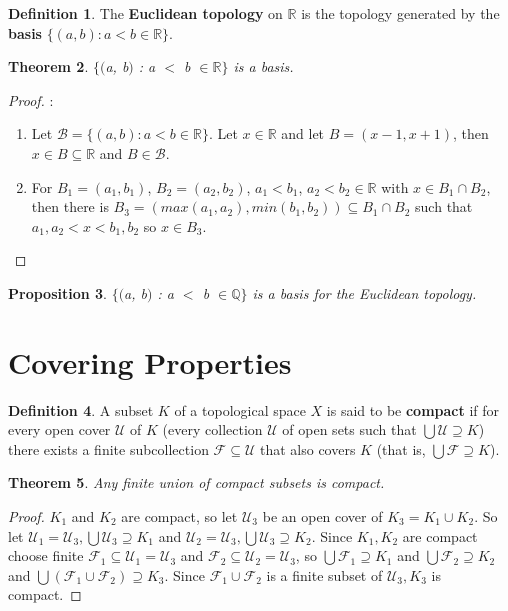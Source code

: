 \documentclass{amsart}
\theoremstyle{plain}
\newtheorem{theorem}{Theorem}
\newtheorem{proposition}[theorem]{Proposition}
\theoremstyle{definition}
\newtheorem{definition}[theorem]{Definition}
\theoremstyle{remark}
\begin{document}
	\begin{definition}
	The \textbf{Euclidean topology} on $\mathbb{R}$ is the topology generated by the \textbf{basis} \newline $\lbrace(a, b) : a < b \in \mathbb{R}\rbrace$.
	\end{definition}

	\begin{theorem}
	$\lbrace($a, b$)$ : a $<$ b $\in \mathbb{R}\rbrace$ is a basis.
	\end{theorem}
	\begin{proof}:\newline
		\begin{enumerate}
			\item Let $\mathcal{B} = \lbrace (a, b) : a < b \in \mathbb{R} \rbrace$. Let $x \in \mathbb{R}$ and let $B = (x-1, x+1)$, then $x \in B \subseteq \mathbb{R}$ and $B \in \mathcal{B}$.	
			\item For $B_1 = (a_1, b_1)$, $B_2 = (a_2, b_2)$, $a_1<b_1$, $a_2<b_2 \in \mathbb{R}$ with $x \in B_1 \cap B_2$, then there is $B_3 = ( max(a_1, a_2), min(b_1, b_2) ) \subseteq B_1 \cap B_2$ such that $a_1,a_2<x<b_1,b_2$ so $ x \in B_3$.
		\end{enumerate}
	\end{proof}

	\begin{proposition}
	$\lbrace($a, b$)$ : a $<$ b $\in \mathbb{Q}\rbrace$ is a basis for the Euclidean topology.
	\end{proposition}

\section{Covering Properties}

	\begin{definition}
	  A subset \(K\) of a topological space \(X\) is said to be \textbf{compact} if for every
	  open cover \(\mathcal U\) of \(K\) (every collection \(\mathcal U\) of open sets
	  such that \(\bigcup \mathcal U\supseteq K\)) there exists a finite subcollection
	  \(\mathcal F\subseteq \mathcal U\) that also covers \(K\) (that is,
	  \(\bigcup\mathcal F\supseteq K\)). \cite{Clontz2010}
	\end{definition}

	\begin{theorem}
	  Any finite union of compact subsets is compact.
	\end{theorem}

	\begin{proof}
	$K_1$ and $K_2$ are compact, so let $\mathcal{U}_3$ be an open cover of $K_3 = K_1 \cup K_2$. So let $\mathcal{U}_1 = \mathcal{U}_3, \bigcup \mathcal{U}_3 \supseteq K_1$ and $\mathcal{U}_2 = \mathcal{U}_3, \bigcup \mathcal{U}_3 \supseteq K_2$. Since $K_1, K_2$ are compact choose finite $\mathcal{F}_1 \subseteq \mathcal{U}_1 = \mathcal{U}_3$ and $\mathcal{F}_2 \subseteq \mathcal{U}_2 = \mathcal{U}_3$, so $\bigcup \mathcal{F}_1 \supseteq K_1$ and $\bigcup \mathcal{F}_2 \supseteq K_2$ and $\bigcup (\mathcal{F}_1 \cup \mathcal{F}_2) \supseteq K_3$. Since $\mathcal{F}_1 \cup \mathcal{F}_2$ is a finite subset of $\mathcal{U}_3, K_3$ is compact.
	\end{proof}
\end{document}

